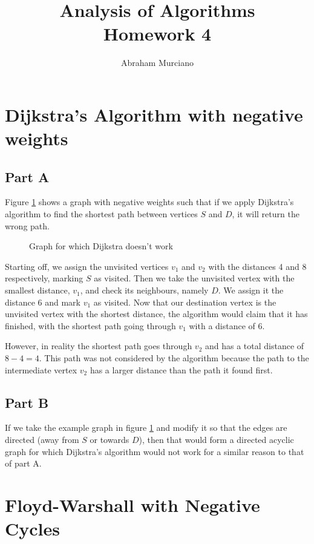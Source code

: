 \documentclass{article}
\title{Analysis of Algorithms \\
\medskip
\large Homework 4}
\author{Abraham Murciano}
\begin{document}
\maketitle

\section{Dijkstra's Algorithm with negative weights}

\subsection*{Part A}

Figure \ref{q1a} shows a graph with negative weights such that if we apply Dijkstra's algorithm to find the shortest path between vertices \(S\) and \(D\), it will return the wrong path.

\begin{figure}[h]
	\centering
	\caption{Graph for which Dijkstra doesn't work}
	\label{q1a}
\end{figure}

Starting off, we assign the unvisited vertices \(v_1\) and \(v_2\) with the distances 4 and 8 respectively, marking \(S\) as visited. Then we take the unvisited vertex with the smallest distance, \(v_1\), and check its neighbours, namely \(D\). We assign it the distance 6 and mark \(v_1\) as visited. Now that our destination vertex is the unvisited vertex with the shortest distance, the algorithm would claim that it has finished, with the shortest path going through \(v_1\) with a distance of 6.

However, in reality the shortest path goes through \(v_2\) and has a total distance of \(8 - 4 = 4\). This path was not considered by the algorithm because the path to the intermediate vertex \(v_2\) has a larger distance than the path it found first.

\subsection*{Part B}

If we take the example graph in figure \ref{q1a} and modify it so that the edges are directed (away from \(S\) or towards \(D\)), then that would form a directed acyclic graph for which Dijkstra's algorithm would not work for a similar reason to that of part A.

\section{Floyd-Warshall with Negative Cycles}
\end{document}
